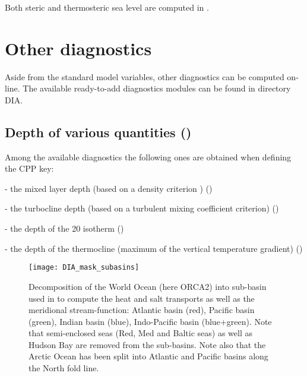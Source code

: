 \documentclass[../main/NEMO_manual]{subfiles}
\begin{document}
Both steric and thermosteric sea level are computed in .

\section{Other diagnostics}
\label{sec:DIA_diag_others}

Aside from the standard model variables, other diagnostics can be computed on-line.
The available ready-to-add diagnostics modules can be found in directory DIA.

\subsection[Depth of various quantities (\textit{diahth.F90})]{Depth of various quantities (\protect{})}

Among the available diagnostics the following ones are obtained when defining the  CPP key:

- the mixed layer depth (based on a density criterion \citep{de-boyer-montegut.madec.ea_JGR04}) ()

- the turbocline depth (based on a turbulent mixing coefficient criterion) ()

- the depth of the 20 isotherm ()

- the depth of the thermocline (maximum of the vertical temperature gradient) ()

\begin{figure}[!t]
  \centering
  \texttt{[image: DIA\_mask\_subasins]}
  \caption[Decomposition of the World Ocean to compute transports as well as
  the meridional stream-function]{
    Decomposition of the World Ocean (here ORCA2) into sub-basin used in to
    compute the heat and salt transports as well as the meridional stream-function:
    Atlantic basin (red), Pacific basin (green),
    Indian basin (blue), Indo-Pacific basin (blue+green).
    Note that semi-enclosed seas (Red, Med and Baltic seas) as well as
    Hudson Bay are removed from the sub-basins.
    Note also that the Arctic Ocean has been split into Atlantic and
    Pacific basins along the North fold line.
  }
  \label{fig:DIA_mask_subasins}
\end{figure}
\end{document}
